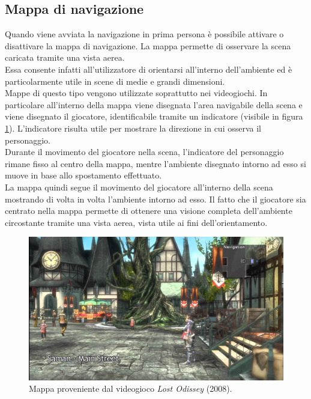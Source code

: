 \subsection{Mappa di navigazione}
Quando viene avviata la navigazione in prima persona è possibile attivare o disattivare la mappa di navigazione.
La mappa permette di osservare la scena caricata tramite una vista aerea.
\\
Essa consente infatti all’utilizzatore di orientarsi all’interno dell’ambiente ed è particolarmente utile in scene di medie e grandi dimensioni.
\\
Mappe di questo tipo vengono utilizzate soprattutto nei videogiochi.
In particolare all’interno della mappa viene disegnata l’area navigabile della scena e viene disegnato il giocatore, identificabile tramite un indicatore (visibile in figura \ref{fig:navigazione_scena_map_lost_odissey}). 
L’indicatore risulta utile per mostrare la direzione in cui osserva il personaggio.
\\
Durante il movimento del giocatore nella scena, l’indicatore del personaggio rimane fisso al centro della mappa, mentre l’ambiente disegnato intorno ad esso si muove in base allo spostamento effettuato.
\\
La mappa quindi segue il movimento del giocatore all’interno della scena mostrando di volta in volta l’ambiente intorno ad esso. 
Il fatto che il giocatore sia centrato nella mappa permette di ottenere una visione completa dell’ambiente circostante tramite una vista aerea, vista utile ai fini dell’orientamento.
\begin{figure}[htb]
 \centering
 \includegraphics[width=1\linewidth]{images/chapter_navigazione_scena/map_lost_odissey.jpg}\hfill
 \caption[Mappe nei videogiochi.]{Mappa proveniente dal videogioco \emph{Lost Odissey} (2008).}
 \label{fig:navigazione_scena_map_lost_odissey}
\end{figure}

